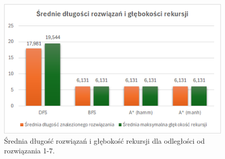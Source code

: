 \documentclass{classrep}
\begin{document}
{    \begin{figure}
        \centering
        \includegraphics[width=\textwidth,height=\textheight,keepaspectratio]{average-solution-lenghts}
        \caption{Średnia długość rozwiązań i głębokość rekursji  dla odległości od rozwiązania 1-7. }
        \label{fig:3}
    \end{figure}




}
\end{document}
